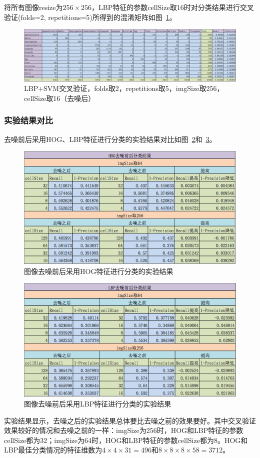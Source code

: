 \documentclass[12pt]{article}
\begin{document}
将所有图像resize为$256 \times 256$，LBP特征的参数cellSize取16时对分类结果进行交叉验证(folds=2, repetitions=5)所得到的混淆矩阵如图~\ref{fig:LBP-SVM-2-folds-5-repetitions-16-256-noNoise}。
\begin{figure}[!ht]
\centering
\includegraphics[width=1.0\linewidth]{LBP-SVM-2-folds-5-repetitions-16-256-noNoise}
\caption{LBP+SVM交叉验证，folds取2，repetitions取5，imgSize取256，cellSize取16（去噪后）}
\label{fig:LBP-SVM-2-folds-5-repetitions-16-256-noNoise}
\end{figure}

\subsubsection{实验结果对比}
去噪前后采用HOG、LBP特征进行分类的实验结果对比如图~\ref{fig:HOG-compare}和~\ref{fig:LBP-compare}。
\begin{figure}[!ht]
\centering
\includegraphics[width=0.45\linewidth]{HOG-compare}
\caption{图像去噪前后采用HOG特征进行分类的实验结果}
\label{fig:HOG-compare}
\end{figure}
\begin{figure}[!ht]
\centering
\includegraphics[width=0.45\linewidth]{LBP-compare}
\caption{图像去噪前后采用LBP特征进行分类的实验结果}
\label{fig:LBP-compare}
\end{figure}
实验结果显示，去噪之后的实验结果总体要比去噪之前的效果要好。其中交叉验证效果较好的情况和去噪之前的一样：imgSize为256时，HOG和LBP特征的参数cellSize都为32；imgSize为64时，HOG和LBP特征的参数cellSize都为8。HOG和LBP最佳分类情况的特征维数为$4\times 4\times 31=496$和$8 \times 8 \times 8 \times 58 = 3712$。
\end{document}
